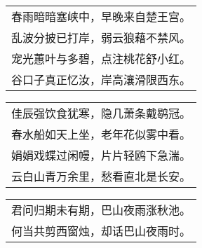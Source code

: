 \nopagebreak%
\nopagebreak%
\noindent\begin{minipage}{\linewidth}
  \vskip-3pt\begin{table}[H]
    \centering
    \begin{tabular}{@{}l@{}}
春雨暗暗塞峡中，早晚来自楚王宫。\\
乱波分披已打岸，弱云狼藉不禁风。\\
宠光蕙叶与多碧，点注桃花舒小红。\\
谷口子真正忆汝，岸高瀼滑限西东。
    \end{tabular}
  \end{table}
\end{minipage}
\vspace{1cm}


\nopagebreak%
\nopagebreak%
\noindent\begin{minipage}{\linewidth}
  \vskip-3pt\begin{table}[H]
    \centering
    \begin{tabular}{@{}l@{}}
佳辰强饮食犹寒，隐几萧条戴鹖冠。\\
春水船如天上坐，老年花似雾中看。\\
娟娟戏蝶过闲幔，片片轻鸥下急湍。\\
云白山青万余里，愁看直北是长安。
    \end{tabular}
  \end{table}
\end{minipage}
\vspace{1cm}


\nopagebreak%
\nopagebreak%
\noindent\begin{minipage}{\linewidth}
  \vskip-3pt\begin{table}[H]
    \centering
    \begin{tabular}{@{}l@{}}
君问归期未有期，巴山夜雨涨秋池。\\
何当共剪西窗烛，却话巴山夜雨时。
    \end{tabular}
  \end{table}
\end{minipage}
\vspace{1cm}


